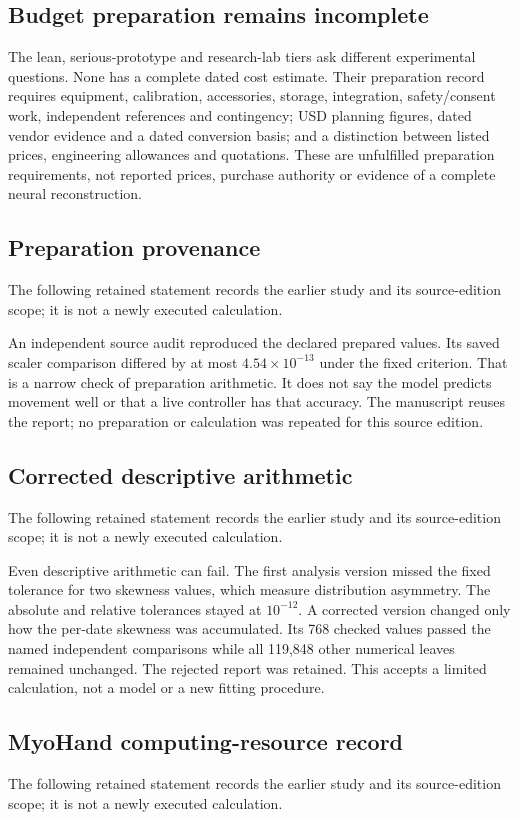 \subsection{Budget preparation remains incomplete}
The lean, serious-prototype and research-lab tiers ask different experimental questions. None has a complete dated cost estimate. Their preparation record requires equipment, calibration, accessories, storage, integration, safety/consent work, independent references and contingency; USD planning figures, dated vendor evidence and a dated conversion basis; and a distinction between listed prices, engineering allowances and quotations. These are unfulfilled preparation requirements, not reported prices, purchase authority or evidence of a complete neural reconstruction.

\subsection{Preparation provenance}
The following retained statement records the earlier study and its source-edition scope; it is not a newly executed calculation.

An independent source audit reproduced the declared prepared values. Its saved
scaler comparison differed by at most $4.54\times10^{-13}$ under the fixed
criterion. That is a narrow check of preparation arithmetic. It does not say
the model predicts movement well or that a live controller has that accuracy.
The manuscript reuses the report; no preparation or calculation was repeated
for this source edition.

\subsection{Corrected descriptive arithmetic}
The following retained statement records the earlier study and its source-edition scope; it is not a newly executed calculation.

Even descriptive arithmetic can fail. The first analysis version missed the
fixed tolerance for two skewness values, which measure distribution asymmetry.
The absolute and relative tolerances stayed at $10^{-12}$. A corrected version
changed only how the per-date skewness was accumulated. Its 768 checked values
passed the named independent comparisons while all 119,848 other numerical
leaves remained unchanged. The rejected report was retained. This accepts a
limited calculation, not a model or a new fitting procedure.

\subsection{MyoHand computing-resource record}
The following retained statement records the earlier study and its source-edition scope; it is not a newly executed calculation.

